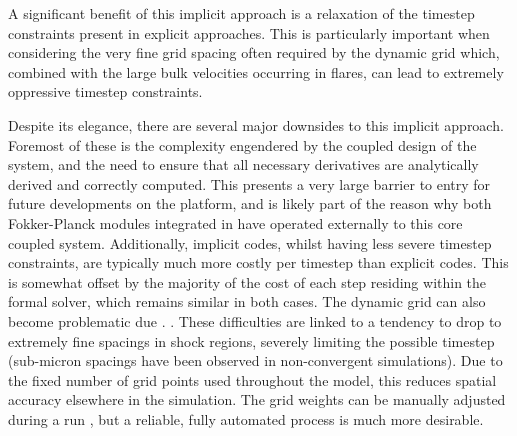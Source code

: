 A significant benefit of this implicit approach is a relaxation of the timestep constraints present in explicit approaches.
This is particularly important when considering the very fine grid spacing often required by the dynamic grid which, combined with the large bulk velocities occurring in flares, can lead to extremely oppressive timestep constraints.

Despite its elegance, there are several major downsides to this implicit approach.
Foremost of these is the complexity engendered by the coupled design of the system, and the need to ensure that all necessary derivatives are analytically derived and correctly computed.
This presents a very large barrier to entry for future developments on the platform, and is likely part of the reason why both Fokker-Planck modules integrated in \Radyn{} have operated externally to this core coupled system.
Additionally, implicit codes, whilst having less severe timestep constraints, are typically much more costly per timestep than explicit codes.
This is somewhat offset by the majority of the cost of each step residing within the formal solver, which remains similar in both cases.
The dynamic grid can also become problematic due .
.
These difficulties are linked to a tendency to drop to extremely fine spacings in shock regions, severely limiting the possible timestep (sub-micron spacings have been observed in non-convergent simulations).
Due to the fixed number of grid points used throughout the model, this reduces spatial accuracy elsewhere in the simulation.
The grid weights can be manually adjusted during a run \citep[e.g.][]{Kowalski2015}, but a reliable, fully automated process is much more desirable.

